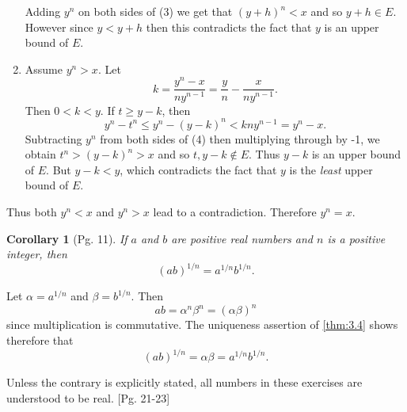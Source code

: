 \documentclass[leqno]{article}
\makeatletter
\newtheorem{corollary}{Corollary}[theorem]
\theoremstyle{definition}
\theoremstyle{remark}
\let\oldproofname=\proofname
\renewcommand{\proofname}{\bf{\textit{\oldproofname}}}
\renewenvironment{proof}[1][\proofname]{\par
  \pushQED{\qed}%
  \normalfont \topsep6\p@\@plus6\p@\relax
  \list{}{\leftmargin=0mm
          \rightmargin=0mm
          \settowidth{\itemindent}{\itshape#1}%
          \labelwidth=4mm
          \parsep=0pt \listparindent=0mm%
  }
  \item[\hskip\labelsep
        \itshape
    #1\@addpunct{.}]\ignorespaces
}{%
  \popQED\endlist\@endpefalse
}
\makeatother
\begin{document}
\begin{proof}
\begin{enumerate}
                        Adding $y^n$ on both sides of (3) we get that $(y+h)^n<x$ and so $y+h\in E$. However since $y<y+h$ then this contradicts the fact that $y$ is an upper bound of $E$. 
                        \item Assume $y^n>x$. Let 
                            \begin{equation*}
                                k=\frac{y^n-x}{ny^{n-1}}=\frac{y}{n}-\frac{x}{ny^{n-1}}.
                            \end{equation*}
                        Then $0<k<y$. If $t\geq y-k$, then
                            \begin{equation}
                                y^n-t^n\leq y^n-(y-k)^n<kny^{n-1}=y^n-x.
                            \end{equation}  
                        Subtracting $y^n$ from both sides of (4) then multiplying through by -1, we obtain $t^n>(y-k)^n>x$ and so $t,y-k\notin E$. Thus $y-k$ is an upper bound of $E$. But $y-k<y$, which contradicts the fact that $y$ is the \emph{least} upper bound of $E$.
                    \end{enumerate}
                Thus both $y^n<x$ and $y^n>x$ lead to a contradiction. Therefore $y^n=x$.
            \end{proof}
        \begin{corollary}[Pg. 11]\label{cor:3.4.1}
            If $a$ and $b$ are positive real numbers and $n$ is a positive integer, then 
                \begin{equation*}
                    (ab)^{1/n}=a^{1/n}b^{1/n}.
                \end{equation*} 
        \end{corollary}
            \begin{proof}
                Let $\alpha=a^{1/n}$ and $\beta=b^{1/n}$. Then 
                    \begin{equation*}
                        ab=\alpha^n\beta^n=(\alpha\beta)^n
                    \end{equation*}
                since multiplication is commutative. The uniqueness assertion of \cref{thm:3.4} shows therefore that 
                    \begin{equation*}
                        (ab)^{1/n}=\alpha\beta=a^{1/n}b^{1/n}.
                    \end{equation*} \cite{rud}
            \end{proof}
    \par\noindent Unless the contrary is explicitly stated, all numbers in these exercises are understood to be real. [Pg. 21-23] \cite{rud}
\end{document}
